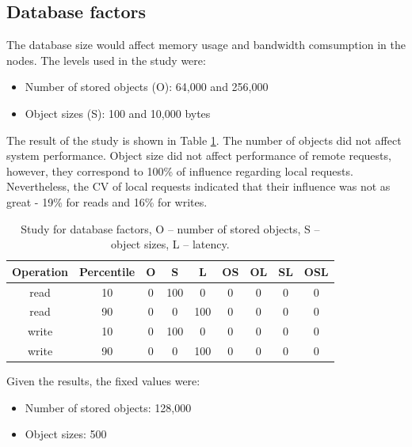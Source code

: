 \documentclass[doublespacing]{bmcart}
\begin{document}
\subsection{Database factors}

The database size would affect memory usage and bandwidth comsumption in the
nodes. The levels used in the study were:

\begin{itemize}

\item Number of stored objects (O): 64,000 and 256,000

\item Object sizes (S): 100 and 10,000 bytes

\end{itemize}

The result of the study is shown in Table
\ref{tab:estudo_para_fatores_de_banco_de_dados}. The number of objects did not
affect system performance. Object size did not affect performance of remote
requests, however, they correspond to 100\% of influence regarding local
requests. Nevertheless, the CV of local requests indicated that their influence
was not as great - 19\% for reads and 16\% for writes.

\begin{table}[h!]
\caption{Study for database factors, O -- number of stored objects, S -- object
sizes, L -- latency.} \begin{tabular}{ccccccccc} \hline

Operation & Percentile & O & S & L & OS & OL & SL & OSL\\\hline

read & 10 & 0 & 100 & 0 & 0 & 0 & 0 & 0 \\

read & 90 & 0 & 0 & 100 & 0 & 0 & 0 & 0 \\

write & 10 & 0 & 100 & 0 & 0 & 0 & 0 & 0 \\

write & 90 & 0 & 0 & 100 & 0 & 0 & 0 & 0 \\\hline

\end{tabular}
\label{tab:estudo_para_fatores_de_banco_de_dados} \end{table}

Given the results, the fixed values were:

\begin{itemize}

\item Number of stored objects: 128,000

\item Object sizes: 500

\end{itemize}
\end{document}
